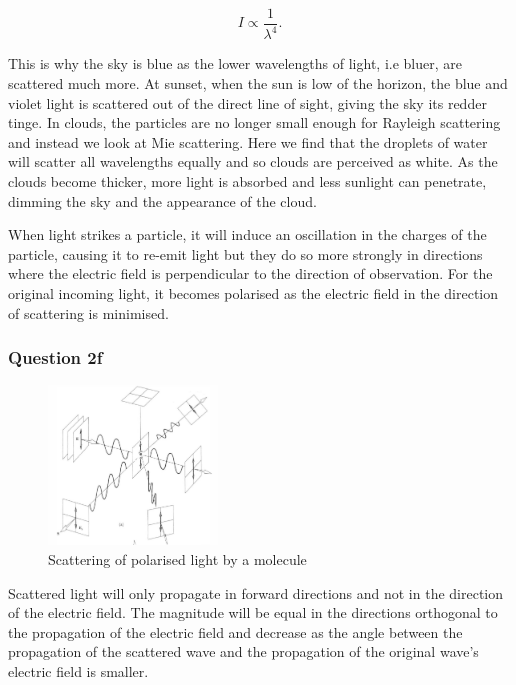 \documentclass{article}
\begin{document}
\begin{equation}
    I \propto \frac{1}{\lambda^4}.
\end{equation}

This is why the sky is blue as the lower wavelengths of light, i.e bluer, are 
scattered much more. At sunset, when the sun is low of the horizon, the blue
and violet light is scattered out of the direct line of sight, giving the sky
its redder tinge. In clouds, the particles are no longer small enough for 
Rayleigh scattering and instead we look at Mie scattering. Here we find that 
the droplets of water will scatter all wavelengths equally and so clouds are
perceived as white. As the clouds become thicker, more light is absorbed and 
less sunlight can penetrate, dimming the sky and the appearance of the cloud.

When light strikes a particle, it will induce an oscillation in the charges 
of the particle, causing it to re-emit light but they do so more strongly in
directions where the electric field is perpendicular to the direction of 
observation. For the original incoming light, it becomes polarised as the 
electric field in the direction of scattering is minimised.

\subsubsection{Question 2f}

\begin{figure}[H]
    \centering
    \includegraphics[width=0.4\textwidth]{prework.png}
    \caption{Scattering of polarised light by a molecule}
\end{figure}

Scattered light will only propagate in forward directions and not in the 
direction of the electric field. The magnitude will be equal in the 
directions orthogonal to the propagation of the electric field and decrease
as the angle between the propagation of the scattered wave and the propagation 
of the original wave's electric field is smaller.
\end{document}
